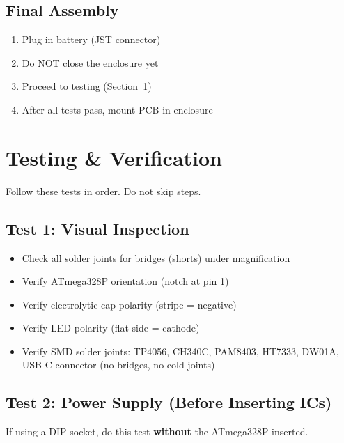 \documentclass[a4paper,11pt]{article}
\renewcommand*{\,}{ }%
\begin{document}
\subsection{Final Assembly}

\begin{enumerate}
    \item Plug in battery (JST connector)
    \item Do NOT close the enclosure yet
    \item Proceed to testing (Section~\ref{sec:testing})
    \item After all tests pass, mount PCB in enclosure
\end{enumerate}

\section{Testing \& Verification}
\label{sec:testing}

Follow these tests in order. Do not skip steps.

\subsection{Test 1: Visual Inspection}

\begin{itemize}
    \item[$\square$] Check all solder joints for bridges (shorts) under magnification
    \item[$\square$] Verify ATmega328P orientation (notch at pin 1)
    \item[$\square$] Verify electrolytic cap polarity (stripe = negative)
    \item[$\square$] Verify LED polarity (flat side = cathode)
    \item[$\square$] Verify SMD solder joints: TP4056, CH340C, PAM8403, HT7333, DW01A, USB-C connector (no bridges, no cold joints)
\end{itemize}

\subsection{Test 2: Power Supply (Before Inserting ICs)}

If using a DIP socket, do this test \textbf{without} the ATmega328P inserted.
\end{document}
